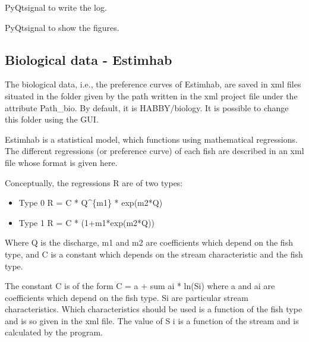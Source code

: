 \documentclass[letterpaper,10pt,english]{sphinxmanual}
\begin{document}
\begin{fulllineitems}
\begin{fulllineitems}
\label{\detokenize{index:src_GUI.estimhab_GUI.EstimhabW.send_log}}
PyQtsignal to write the log.

\end{fulllineitems}


\begin{fulllineitems}
\label{\detokenize{index:src_GUI.estimhab_GUI.EstimhabW.show_fig}}
PyQtsignal to show the figures.

\end{fulllineitems}


\end{fulllineitems}



\subsection{Biological data - Estimhab}
\label{\detokenize{index:biological-data-estimhab}}
The biological data, i.e., the preference curves of Estimhab, are saved in xml files
situated in the folder given by the path written in the xml project file under the
attribute Path\_bio. By default, it is HABBY/biology. It is possible to change this folder
using the GUI.

Estimhab is a statistical model, which functions using mathematical regressions.
The different regressions (or preference curve) of each fish are described in an xml file
whose format is given here.

Conceptually, the regressions R are of two types:
\begin{itemize}
\item {} 
Type 0          R = C * Q\textasciicircum{}\{m1\} * exp(m2*Q)

\item {} 
Type 1          R = C * (1+m1*exp(m2*Q))

\end{itemize}

Where Q is the discharge, m1 and m2 are coefficients which depend on the fish type, and C is a
constant which depends on the stream characteristic and the fish type.

The constant C is of the form C = a + sum ai * ln(Si) where a and ai are coefficients which depend on
the fish type. Si are particular stream characteristics. Which characteristics should be used is a
function of the fish type and is so given in the xml file. The value of S i is a function of the stream
and is calculated by the program.
\end{document}
